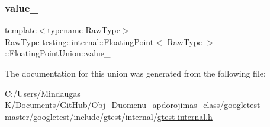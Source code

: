 \mbox{\label{uniontesting_1_1internal_1_1_floating_point_1_1_floating_point_union_a4ee324889f70577721393e8e1920e4c6}} 
\subsubsection{\texorpdfstring{value\_}{value\_}}
{\footnotesize\ttfamily template$<$typename Raw\+Type$>$ \\
Raw\+Type \mbox{\hyperlink{classtesting_1_1internal_1_1_floating_point}{testing\+::internal\+::\+Floating\+Point}}$<$ Raw\+Type $>$\+::Floating\+Point\+Union\+::value\+\_\+}



The documentation for this union was generated from the following file\+:\begin{DoxyCompactItemize}
\item 
C\+:/\+Users/\+Mindaugas K/\+Documents/\+Git\+Hub/\+Obj\+\_\+\+Duomenu\+\_\+apdorojimas\+\_\+class/googletest-\/master/googletest/include/gtest/internal/\mbox{\hyperlink{googletest-master_2googletest_2include_2gtest_2internal_2gtest-internal_8h}{gtest-\/internal.\+h}}\end{DoxyCompactItemize}
